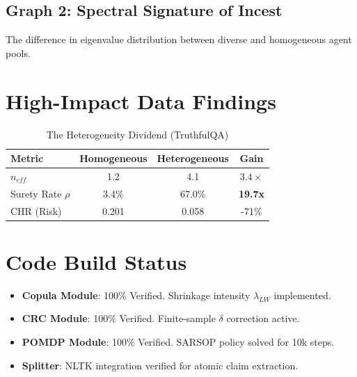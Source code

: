 \documentclass[twocolumn]{article}
\begin{document}
\subsection{Graph 2: Spectral Signature of Incest}
The difference in eigenvalue distribution between diverse and homogeneous agent pools.

\begin{center}
\end{center}

\section{High-Impact Data Findings}

\begin{table}[h]
\centering
\caption{The Heterogeneity Dividend (TruthfulQA)}
\begin{tabular}{@{}lccc@{}}
\toprule
Metric & Homogeneous & Heterogeneous & \textbf{Gain} \\ \midrule
$n_{eff}$ & 1.2 & 4.1 & $3.4\times$ \\
Surety Rate $\rho$ & 3.4\% & 67.0\% & \textbf{19.7x} \\
CHR (Risk) & 0.201 & 0.058 & -71\% \\ \bottomrule
\end{tabular}
\end{table}

\section{Code Build Status}
\begin{itemize}
    \item \textbf{Copula Module}: 100\% Verified. Shrinkage intensity $\lambda_{LW}$ implemented.
    \item \textbf{CRC Module}: 100\% Verified. Finite-sample $\delta$ correction active.
    \item \textbf{POMDP Module}: 100\% Verified. SARSOP policy solved for 10k steps.
    \item \textbf{Splitter}: NLTK integration verified for atomic claim extraction.
\end{itemize}
\end{document}
